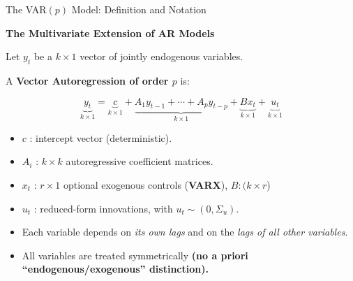 \documentclass{beamer}
\begin{document}
\begin{frame}{The VAR$(p)$ Model: Definition and Notation}
\small

\textbf{The Multivariate Extension of AR Models}

\medskip
Let $y_t$ be a $k \times 1$ vector of jointly endogenous variables.  

A \textbf{Vector Autoregression of order $p$} is:

\[
\underbrace{y_t}_{k\times 1}
= 
\underbrace{c}_{k\times 1}
+
\underbrace{A_1 y_{t-1} + \cdots + A_p y_{t-p}}_{k\times 1}
+
\underbrace{B x_t}_{k\times 1}
+
\underbrace{u_t}_{k\times 1}
\]

\begin{itemize}
    \item $c$ : intercept vector (deterministic).  
    \item $A_i$ : $k \times k$ autoregressive coefficient matrices.  
    \item $x_t$ : $r \times 1$ optional exogenous controls (\textbf{VARX}), $B :(k\times r$)
    \item $u_t$ : reduced-form innovations, with $u_t \sim (0, \Sigma_u)$.
\end{itemize}

\bigskip

\begin{itemize}
    \item Each variable depends on \emph{its own lags} and on the \emph{lags of all other variables}.
    \item All variables are treated symmetrically\textbf{ (no a priori “endogenous/exogenous” distinction).}
\end{itemize}
\end{frame}
\end{document}
